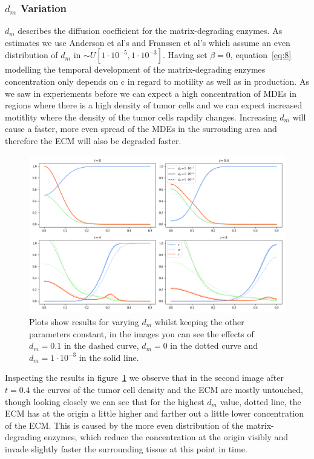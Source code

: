 \subsubsection*{$d_m$ Variation}
$d_m$ describes the diffusion coefficient for the matrix-degrading enzymes. As estimates we use Anderson et al's and Franssen et al's which assume an even distribution of $d_m$ in  $\sim U[1\cdot 10^{-5},1\cdot 10^{-3}]$. Having set $\beta=0$, equation~\ref{eq:8} modelling the temporal development of the matrix-degrading enzymes concentration only depends on c in regard to motility as well as in production. As we saw in experiements before we can expect a high concentration of MDEs in regions where there is a high density of tumor cells and we can expect increased motitlity where the density of the tumor cells rapdily changes. Increasing $d_m$ will cause a faster, more even spread of the MDEs in the surrouding area and therefore the ECM will also be degraded faster.
\begin{figure}[h]
    \centering
    \includegraphics[width=\textwidth]{resources/images/dm_variation.png}
    \caption{Plots show results for varying $d_m$ whilst keeping the other parameters constant, in the images you can see the effects of $d_m=0.1$ in the dashed curve, $d_m=0$ in the dotted curve and $d_m=1\cdot 10^{-3}$ in the solid line.}
    \label{fig:dm_variation}
\end{figure}
Inspecting the results in figure~\ref{fig:dm_variation} we observe that in the second image after $t=0.4$ the curves of the tumor cell density and the ECM are mostly untouched, though looking closely we can see that for the highest $d_m$ value, dotted line, the ECM has at the origin a little higher and farther out a little lower concentration of the ECM. This is caused by the more even distribution of the matrix-degrading enzymes, which reduce the concentration at the origin visibly and invade slightly faster the surrounding tissue at this point in time.\newline

